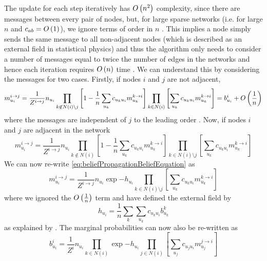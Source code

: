 The update for each step iteratively has $O\left(n^{2}\right)$ complexity, since there are messages between every pair of nodes, but, for large sparse networks (i.e. for large $n$ and $c_{ab} = O\left(1\right)$), we ignore terms of order in $n$ \cite{DKM+13}.
This implies a node simply sends the same message to all non-adjacent nodes (which is described as an external field in statistical physics) and thus the algorithm only needs to consider a number of messages equal to twice the number of edges in the networks and hence each iteration requires $O\left(n\right)$ time \cite{DKM+13}.
We can understand this by considering the messages for two cases. Firstly, if nodes $i$ and $j$ are not adjacent,
\begin{equation}
	\label{eq:beliefPropagationMessageEquation2}
	m_{u_{i}}^{i \rightarrow j} = \frac{1}{Z^{i \rightarrow j}} n_{u_{i}} \prod_{k \not\in N(i) \setminus j} \left[ 1 - \frac{1}{n} \sum_{u_{k}} c_{u_{k}u_{i}} m_{u_{k}}^{k \rightarrow i} \right] \prod_{k \in N(i)} \left[ \sum_{u_{k}} c_{u_{k}u_{i}} m_{u_{k}}^{k \rightarrow i} \right] = b_{u_{i}}^{i} + O\left(\frac{1}{n}\right)
\end{equation} 
 where the messages are independent of $j$ to the leading order \cite{DKM+13}. Now, if nodes $i$ and $j$ are adjacent in the network
\begin{equation}
	\label{eq:beliefPropagationMessageEquation3}
	m_{u_{i}}^{i \rightarrow j} = \frac{1}{Z^{i \rightarrow j}} n_{u_{i}} \prod_{k \not\in N(i)} \left[ 1 - \frac{1}{n} \sum_{u_{k}} c_{u_{k}u_{i}} m_{u_{k}}^{k \rightarrow i} \right] \prod_{k \in N(i) \setminus j} \left[ \sum_{u_{k}} c_{u_{k}u_{i}} m_{u_{k}}^{k \rightarrow i} \right] 
\end{equation}
We can now re-write \cref{eq:beliefPropagationBeliefEquation}  as
\begin{equation}
	\label{eq:beliefPropagationMessageEquation4}
	m_{u_{i}}^{i \rightarrow j} = \frac{1}{Z^{i \rightarrow j}} n_{u_{i}} \exp{-h_{u_{i}}} \prod_{k \in N(i) \setminus j} \left[ \sum_{u_{k}} c_{u_{k}u_{i}} m_{u_{k}}^{k \rightarrow i} \right] 
\end{equation}
where we ignored the $O\left(\frac{1}{n}\right)$ term and have defined the external field by
\begin{equation}
	\label{eq:beliefPropagationExternalField}
	h_{u_{i}} = \frac{1}{n} \sum_{k} \sum_{u_{k}} c_{u_{k}u_{i}} b_{u_{k}}^{k}
\end{equation}
as explained by \cite{DKM+13}. The marginal probabilities can now also be re-written as
\begin{equation}
	\label{eq:beliefPropagationBeliefEquation2}
	b_{u_{i}}^{i} = \frac{1}{Z^{i}} n_{u_{i}} \prod_{k \in N(i)} \exp{-h_{u_{i}}} \prod_{j \in N(i)} \left[ \sum_{u_{j}} c_{u_{j}u_{i}} m_{u_{j}}^{j \rightarrow i} \right] 
\end{equation}
